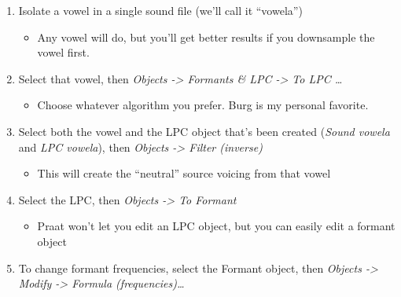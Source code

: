 \documentclass[11pt]{article}
\def\tightlist{}
\begin{document}
\begin{enumerate}
\def\labelenumi{\arabic{enumi}.}
\tightlist
\item
  Isolate a vowel in a single sound file (we'll call it ``vowela'')

  \begin{itemize}
  \tightlist
  \item
    Any vowel will do, but you'll get better results if you downsample
    the vowel first.
  \end{itemize}
\item
  Select that vowel, then \emph{Objects -\textgreater{} Formants \& LPC
  -\textgreater{} To LPC \ldots{}}

  \begin{itemize}
  \tightlist
  \item
    Choose whatever algorithm you prefer. Burg is my personal favorite.
  \end{itemize}
\item
  Select both the vowel and the LPC object that's been created
  (\emph{Sound vowela} and \emph{LPC vowela}), then \emph{Objects
  -\textgreater{} Filter (inverse)}

  \begin{itemize}
  \tightlist
  \item
    This will create the ``neutral'' source voicing from that vowel
  \end{itemize}
\item
  Select the LPC, then \emph{Objects -\textgreater{} To Formant}

  \begin{itemize}
  \tightlist
  \item
    Praat won't let you edit an LPC object, but you can easily edit a
    formant object
  \end{itemize}
\item
  To change formant frequencies, select the Formant object, then
  \emph{Objects -\textgreater{} Modify -\textgreater{} Formula
  (frequencies)\ldots{}}
\end{enumerate}
\end{document}

